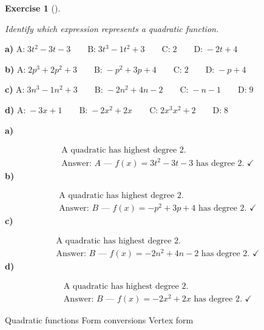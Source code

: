 \documentclass[
  letterpaper,
  DIV=11,
  numbers=noendperiod]{scrreprt}
\theoremstyle{definition}
\newtheorem{exercise}{Exercise}[chapter]
\theoremstyle{remark}
\begin{document}
\begin{exercise}[]\protect\hypertarget{exr-u7-18}{}\label{exr-u7-18}

\emph{Identify which expression represents a quadratic function.}

\textbf{a)}
\(\displaystyle \text{A:}\; 3t^2 - 3t - 3 \qquad \text{B:}\; 3t^3 - 1t^2 + 3 \qquad \text{C:}\; 2 \qquad \text{D:}\; -2t + 4\)

\textbf{b)}
\(\displaystyle \text{A:}\; 2p^3 + 2p^2 + 3 \qquad \text{B:}\; -p^2 + 3p + 4 \qquad \text{C:}\; 2 \qquad \text{D:}\; -p + 4\)

\textbf{c)}
\(\displaystyle \text{A:}\; 3n^3 - 1n^2 + 3 \qquad \text{B:}\; -2n^2 + 4n - 2 \qquad \text{C:}\; -n - 1 \qquad \text{D:}\; 9\)

\textbf{d)}
\(\displaystyle \text{A:}\; -3x + 1 \qquad \text{B:}\; -2x^2 + 2x \qquad \text{C:}\; 2x^3 x^2 + 2 \qquad \text{D:}\; 8\)

\begin{tcolorbox}[enhanced jigsaw, opacitybacktitle=0.6, coltitle=black, arc=.35mm, colframe=quarto-callout-tip-color-frame, colback=white, bottomrule=.15mm, left=2mm, colbacktitle=quarto-callout-tip-color!10!white, titlerule=0mm, opacityback=0, title=\textcolor{quarto-callout-tip-color}{\faLightbulb}\hspace{0.5em}{🔍 View Solutions}, leftrule=.75mm, breakable, rightrule=.15mm, bottomtitle=1mm, toptitle=1mm, toprule=.15mm]

\textbf{a)}

\[
\begin{aligned}
\text{A quadratic has highest degree 2.} \\[4pt] \text{Answer: } A \text{ — } f(x) = 3t^2 - 3t - 3 \text{ has degree 2. }\checkmark
\end{aligned}
\] \textbf{b)}

\[
\begin{aligned}
\text{A quadratic has highest degree 2.} \\[4pt] \text{Answer: } B \text{ — } f(x) = -p^2 + 3p + 4 \text{ has degree 2. }\checkmark
\end{aligned}
\] \textbf{c)}

\[
\begin{aligned}
\text{A quadratic has highest degree 2.} \\[4pt] \text{Answer: } B \text{ — } f(x) = -2n^2 + 4n - 2 \text{ has degree 2. }\checkmark
\end{aligned}
\] \textbf{d)}

\[
\begin{aligned}
\text{A quadratic has highest degree 2.} \\[4pt] \text{Answer: } B \text{ — } f(x) = -2x^2 + 2x \text{ has degree 2. }\checkmark
\end{aligned}
\]

\end{tcolorbox}

{Quadratic functions} {Form conversions} {Vertex form}

\end{exercise}
\end{document}
